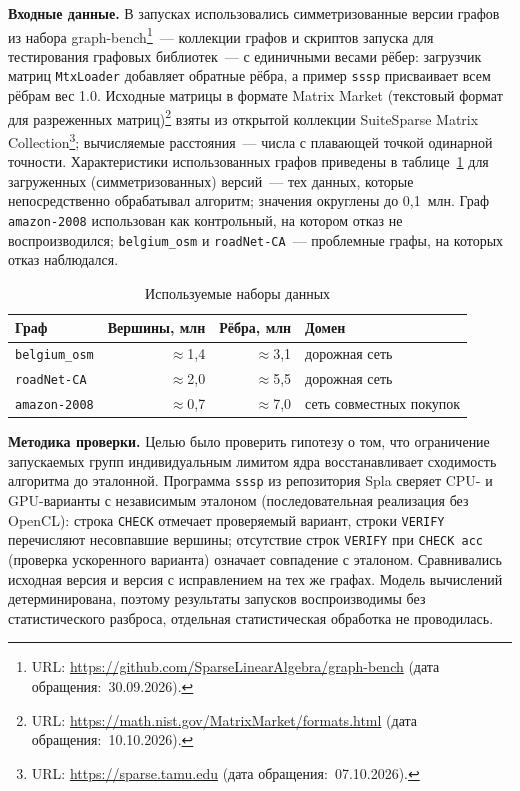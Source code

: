 \documentclass[a4paper]{article}
\begin{document}
\textbf{Входные данные.} В запусках использовались симметризованные версии графов из набора graph-bench\footnote{URL: \url{https://github.com/SparseLinearAlgebra/graph-bench} (дата обращения:~30.09.2026).}~--- коллекции графов и скриптов запуска для тестирования графовых библиотек~--- с единичными весами рёбер: загрузчик матриц \texttt{MtxLoader} добавляет обратные рёбра, а пример \texttt{sssp} присваивает всем рёбрам вес 1.0. Исходные матрицы в формате Matrix Market (текстовый формат для разреженных матриц)\footnote{URL: \url{https://math.nist.gov/MatrixMarket/formats.html} (дата обращения:~10.10.2026).} взяты из открытой коллекции SuiteSparse Matrix Collection\footnote{URL: \url{https://sparse.tamu.edu} (дата обращения:~07.10.2026).}; вычисляемые расстояния~--- числа с плавающей точкой одинарной точности. Характеристики использованных графов приведены в таблице~\ref{tab:graphs} для загруженных (симметризованных) версий~--- тех данных, которые непосредственно обрабатывал алгоритм; значения округлены до 0,1~млн. Граф \texttt{amazon-2008} использован как контрольный, на котором отказ не воспроизводился; \texttt{belgium\_osm} и \texttt{roadNet-CA}~--- проблемные графы, на которых отказ наблюдался.

\begin{table}[htbp]
    \centering
    \caption{Используемые наборы данных}
    \label{tab:graphs}
    \begin{tabular}{lrrl}
        \toprule
        \textbf{Граф} & \textbf{Вершины, млн} & \textbf{Рёбра, млн} & \textbf{Домен} \\
        \midrule
        \texttt{belgium\_osm} & $\approx$1,4 & $\approx$3,1 & дорожная сеть \\
        \texttt{roadNet-CA} & $\approx$2,0 & $\approx$5,5 & дорожная сеть \\
        \texttt{amazon-2008} & $\approx$0,7 & $\approx$7,0 & сеть совместных покупок \\
        \bottomrule
    \end{tabular}
\end{table}

\textbf{Методика проверки.} Целью было проверить гипотезу о том, что ограничение запускаемых групп индивидуальным лимитом ядра восстанавливает сходимость алгоритма до эталонной. Программа \texttt{sssp} из репозитория Spla сверяет CPU- и GPU-варианты с независимым эталоном (последовательная реализация без OpenCL): строка \texttt{CHECK} отмечает проверяемый вариант, строки \texttt{VERIFY} перечисляют несовпавшие вершины; отсутствие строк \texttt{VERIFY} при \texttt{CHECK acc} (проверка ускоренного варианта) означает совпадение с эталоном. Сравнивались исходная версия и версия с исправлением на тех же графах. Модель вычислений детерминирована, поэтому результаты запусков воспроизводимы без статистического разброса, отдельная статистическая обработка не проводилась.
\end{document}
